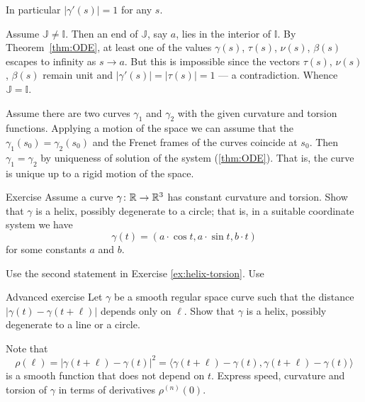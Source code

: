 In particular $|\gamma'(s)|=1$ for any $s$.

Assume $\mathbb{J}\ne \mathbb{I}$.
Then an end of $\mathbb{J}$, say $a$, lies in the interior of $\mathbb{I}$.
By Theorem~\ref{thm:ODE}, at least one of the values $\gamma(s)$, $\tau(s)$, $\nu(s)$, $\beta(s)$
escapes to infinity as $s\to a$.
But this is impossible since the vectors $\tau(s)$, $\nu(s)$, $\beta(s)$ remain unit and $|\gamma'(s)|=|\tau(s)|=1$ --- a contradiction.
Whence $\mathbb{J}= \mathbb{I}$.

Assume there are two curves $\gamma_1$ and $\gamma_2$ with the given curvature and torsion functions.
Applying a motion of the space we can assume that the $\gamma_1(s_0)=\gamma_2(s_0)$ and the Frenet frames of the curves coincide at $s_0$.
Then $\gamma_1=\gamma_2$ by uniqueness of solution of the system (\ref{thm:ODE}).
That is, the curve is unique up to a rigid motion of the space.
\qeds

\begin{thm}{Exercise}
Assume a curve $\gamma\colon\mathbb{R}\to\mathbb{R}^3$ has constant curvature and torsion.
Show that $\gamma$ is a helix, possibly degenerate to a circle;
that is, in a suitable coordinate system we have
\[\gamma(t)=(a\cdot \cos t,a\cdot\sin t, b\cdot t)\]
for some constants $a$ and $b$.
\end{thm}

 Use the second statement in Exercise \ref{ex:helix-torsion}.
Use 


\begin{thm}{Advanced exercise}
Let $\gamma$ be a smooth regular space curve such that the distance $|\gamma(t)-\gamma(t+\ell)|$ depends only on $\ell$.
Show that $\gamma$ is a helix, possibly degenerate to a line or a circle.
\end{thm}

 Note that 
\[\rho(\ell)=|\gamma(t+\ell)-\gamma(t)|^2=\langle \gamma(t+\ell)-\gamma(t),\gamma(t+\ell)-\gamma(t)\rangle\] 
is a smooth function that does not depend on $t$.
Express speed, curvature and torsion of $\gamma$ in terms of derivatives $\rho^{(n)}(0)$.
